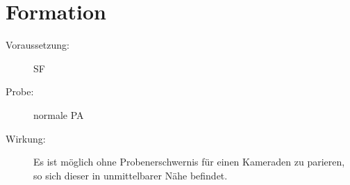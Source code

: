 \section{Formation}
\label{reaktion.formation}
\begin{description}
    \item[Voraussetzung:]
        SF 
    \item[Probe:]
        normale PA
    \item[Wirkung:]
        Es ist möglich ohne Probenerschwernis für einen Kameraden zu parieren, so sich dieser in unmittelbarer Nähe befindet.
\end{description}
